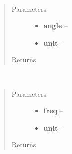 \documentclass[a4paper,10pt,english]{sphinxmanual}
\begin{document}

\begin{fulllineitems}
\label{wtoapi:wtoDatabase.convert_deg}~\begin{quote}\begin{description}
\item[{Parameters}] \leavevmode\begin{itemize}
\item {} 
\textbf{angle} -- 

\item {} 
\textbf{unit} -- 

\end{itemize}

\item[{Returns}] \leavevmode


\end{description}\end{quote}

\end{fulllineitems}


\begin{fulllineitems}
\label{wtoapi:wtoDatabase.convert_ghz}~\begin{quote}\begin{description}
\item[{Parameters}] \leavevmode\begin{itemize}
\item {} 
\textbf{freq} -- 

\item {} 
\textbf{unit} -- 

\end{itemize}

\item[{Returns}] \leavevmode


\end{description}\end{quote}

\end{fulllineitems}

\end{document}
